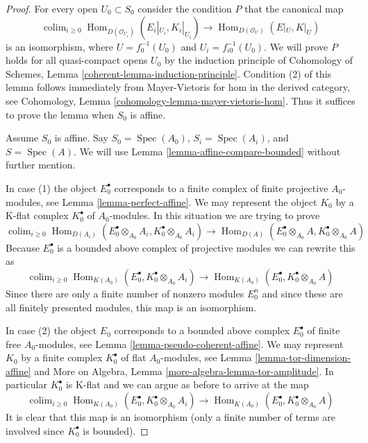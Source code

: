 \documentclass{stacks-project}
\theoremstyle{plain}
\theoremstyle{definition}
\theoremstyle{remark}
\numberwithin{equation}{subsection}
\def\colim{\mathop{\mathrm{colim}}\nolimits}
\def\Spec{\mathop{\mathrm{Spec}}}
\def\Hom{\mathop{\mathrm{Hom}}\nolimits}
\begin{document}
\begin{proof}
For every open $U_0 \subset S_0$ consider the condition $P$ that the canonical
map
$$
\colim_{i \geq 0} \Hom_{D(\mathcal{O}_{U_i})}(E_i|_{U_i}, K_i|_{U_i})
\longrightarrow
\Hom_{D(\mathcal{O}_U)}(E|_U, K|_U)
$$
is an isomorphism, where $U = f_0^{-1}(U_0)$ and $U_i = f_{i0}^{-1}(U_0)$.
We will prove $P$ holds for all quasi-compact opens $U_0$
by the induction principle of
Cohomology of Schemes, Lemma \ref{coherent-lemma-induction-principle}.
Condition (2) of this lemma follows immediately from Mayer-Vietoris
for hom in the derived category, see
Cohomology, Lemma \ref{cohomology-lemma-mayer-vietoris-hom}.
Thus it suffices to prove the lemma when $S_0$ is affine.

\medskip\noindent
Assume $S_0$ is affine. Say $S_0 = \Spec(A_0)$, $S_i = \Spec(A_i)$, and
$S = \Spec(A)$. We will use Lemma \ref{lemma-affine-compare-bounded}
without further mention.

\medskip\noindent
In case (1) the object $E_0^\bullet$ corresponds to a finite complex
of finite projective $A_0$-modules, see Lemma \ref{lemma-perfect-affine}.
We may represent the object $K_0$ by a K-flat complex $K_0^\bullet$
of $A_0$-modules. In this situation we are trying to prove
$$
\colim_{i \geq 0} \Hom_{D(A_i)}(E_0^\bullet \otimes_{A_0} A_i,
K_0^\bullet \otimes_{A_0} A_i)
\longrightarrow
\Hom_{D(A)}(E_0^\bullet \otimes_{A_0} A, K_0^\bullet \otimes_{A_0} A)
$$
Because $E_0^\bullet$ is a bounded above complex of projective modules
we can rewrite this as
$$
\colim_{i \geq 0} \Hom_{K(A_0)}(E_0^\bullet,
K_0^\bullet \otimes_{A_0} A_i)
\longrightarrow
\Hom_{K(A_0)}(E_0^\bullet, K_0^\bullet \otimes_{A_0} A)
$$
Since there are only a finite number of nonzero modules
$E_0^n$ and since these are all finitely presented modules, this
map is an isomorphism.

\medskip\noindent
In case (2) the object $E_0$ corresponds to a
bounded above complex $E_0^\bullet$ of finite free $A_0$-modules,
see Lemma \ref{lemma-pseudo-coherent-affine}.
We may represent $K_0$ by a finite complex $K_0^\bullet$
of flat $A_0$-modules, see Lemma \ref{lemma-tor-dimension-affine}
and
More on Algebra, Lemma \ref{more-algebra-lemma-tor-amplitude}.
In particular $K_0^\bullet$ is K-flat and we can argue as before
to arrive at the map
$$
\colim_{i \geq 0} \Hom_{K(A_0)}(E_0^\bullet,
K_0^\bullet \otimes_{A_0} A_i)
\longrightarrow
\Hom_{K(A_0)}(E_0^\bullet, K_0^\bullet \otimes_{A_0} A)
$$
It is clear that this map is an isomorphism (only a finite number of
terms are involved since $K_0^\bullet$ is bounded).
\end{proof}
\end{document}
